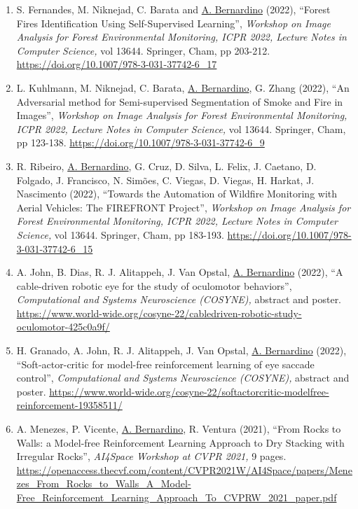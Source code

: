 \begin{enumerate}
{  in Computer Science,} vol 13644. Springer, Cham, pp 194-202.
  \url{https://doi.org/10.1007/978-3-031-37742-6_16}
\item
  S. Fernandes, M. Niknejad, C. Barata and \ul{A. Bernardino} (2022),
  ``Forest Fires Identification Using Self-Supervised Learning'',
  \emph{Workshop on Image Analysis for Forest Environmental Monitoring,
  ICPR 2022, Lecture Notes in Computer Science,} vol 13644. Springer,
  Cham, pp 203-212. \url{https://doi.org/10.1007/978-3-031-37742-6_17}
\item
  L. Kuhlmann, M. Niknejad, C. Barata, \ul{A. Bernardino}, G. Zhang
  (2022), ``An Adversarial method for Semi-supervised Segmentation of
  Smoke and Fire in Images'', \emph{Workshop on Image Analysis for
  Forest Environmental Monitoring, ICPR 2022, Lecture Notes in Computer
  Science,} vol 13644. Springer, Cham, pp 123-138.
  \url{https://doi.org/10.1007/978-3-031-37742-6_9}
\item
  R. Ribeiro, \ul{A. Bernardino}, G. Cruz, D. Silva, L. Felix, J.
  Caetano, D. Folgado, J. Francisco, N. Simões, C. Viegas, D. Viegas, H.
  Harkat, J. Nascimento (2022), ``Towards the Automation of Wildfire
  Monitoring with Aerial Vehicles: The FIREFRONT Project'',
  \emph{Workshop on Image Analysis for Forest Environmental Monitoring,
  ICPR 2022, Lecture Notes in Computer Science,} vol 13644. Springer,
  Cham, pp 183-193. \url{https://doi.org/10.1007/978-3-031-37742-6_15}
\item
  A. John, B. Dias, R. J. Alitappeh, J. Van Opstal, \ul{A. Bernardino}
  (2022), ``A cable-driven robotic eye for the study of oculomotor
  behaviors'', \emph{Computational and Systems Neuroscience (COSYNE),}
  abstract and poster.
  \url{https://www.world-wide.org/cosyne-22/cabledriven-robotic-study-oculomotor-425c0a9f/}
\item
  H. Granado, A. John, R. J. Alitappeh, J. Van Opstal, \ul{A.
  Bernardino} (2022), ``Soft-actor-critic for model-free reinforcement
  learning of eye saccade control'', \emph{Computational and Systems
  Neuroscience (COSYNE),} abstract and poster.
  \url{https://www.world-wide.org/cosyne-22/softactorcritic-modelfree-reinforcement-19358511/}
\item
  A. Menezes, P. Vicente, \ul{A. Bernardino}, R. Ventura (2021), ``From
  Rocks to Walls: a Model-free Reinforcement Learning Approach to Dry
  Stacking with Irregular Rocks'', \emph{AI4Space Workshop at CVPR
  2021,} 9 pages.
  \url{https://openaccess.thecvf.com/content/CVPR2021W/AI4Space/papers/Menezes_From_Rocks_to_Walls_A_Model-Free_Reinforcement_Learning_Approach_To_CVPRW_2021_paper.pdf}~

\end{enumerate}
